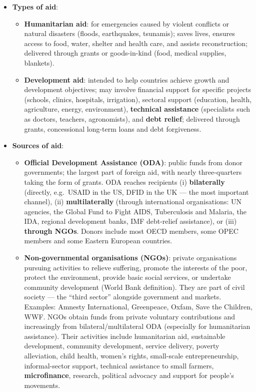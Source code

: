 \begin{itemize}
  \item \textbf{Types of aid}:
  \begin{itemize}
    \item \textbf{Humanitarian aid}: for emergencies caused by violent conflicts or natural disasters (floods, earthquakes, tsunamis); saves lives, ensures access to food, water, shelter and health care, and assists reconstruction; delivered through grants or goods-in-kind (food, medical supplies, blankets).
    \item \textbf{Development aid}: intended to help countries achieve growth and development objectives; may involve financial support for specific projects (schools, clinics, hospitals, irrigation), sectoral support (education, health, agriculture, energy, environment), \textbf{technical assistance} (specialists such as doctors, teachers, agronomists), and \textbf{debt relief}; delivered through grants, concessional long-term loans and debt forgiveness.
  \end{itemize}
  \item \textbf{Sources of aid}:
  \begin{itemize}
    \item \textbf{Official Development Assistance (ODA)}: public funds from donor governments; the largest part of foreign aid, with nearly three-quarters taking the form of grants. ODA reaches recipients (i) \textbf{bilaterally} (directly, e.g.\ USAID in the US, DFID in the UK --- the most important channel), (ii) \textbf{multilaterally} (through international organisations: UN agencies, the Global Fund to Fight AIDS, Tuberculosis and Malaria, the IDA, regional development banks, IMF debt-relief assistance), or (iii) \textbf{through NGOs}. Donors include most OECD members, some OPEC members and some Eastern European countries.
    \item \textbf{Non-governmental organisations (NGOs)}: private organisations pursuing activities to relieve suffering, promote the interests of the poor, protect the environment, provide basic social services, or undertake community development (World Bank definition). They are part of civil society --- the ``third sector'' alongside government and markets. Examples: Amnesty International, Greenpeace, Oxfam, Save the Children, WWF. NGOs obtain funds from private voluntary contributions and increasingly from bilateral/multilateral ODA (especially for humanitarian assistance). Their activities include humanitarian aid, sustainable development, community development, service delivery, poverty alleviation, child health, women's rights, small-scale entrepreneurship, informal-sector support, technical assistance to small farmers, \textbf{microfinance}, research, political advocacy and support for people's movements.

\end{itemize}
\end{itemize}
